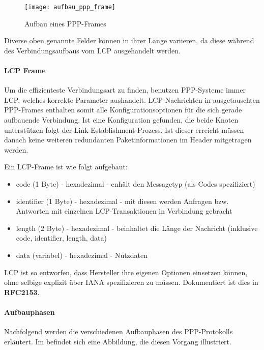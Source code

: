  \begin{figure}[htp]
  \begin{center}
   \texttt{[image: aufbau\_ppp\_frame]}
  \end{center}
  \caption[Aufbau eines PPP-Frames]{Aufbau eines PPP-Frames \cite{tcpipillustrated}}
  \label{abb:aufbau_ppp_frame}
 \end{figure}

Diverse oben genannte Felder können in ihrer Länge variieren, da 
diese während des Verbindungsaufbaus vom \ac{LCP} ausgehandelt werden.

\paragraph{LCP Frame} Um die effizienteste Verbindungsart zu finden, benutzen PPP-Systeme
immer \ac{LCP}, welches korrekte Parameter aushandelt. LCP-Nachrichten in ausgetauschten
PPP-Frames enthalten somit alle Konfigurationsoptionen für die sich gerade aufbauende
Verbindung. Ist eine Konfiguration gefunden, die beide Knoten unterstützen folgt der
Link-Establishment-Prozess. Ist dieser erreicht müssen danach keine weiteren redundanten
Paketinformationen im Header mitgetragen werden.

Ein LCP-Frame ist wie folgt aufgebaut:
\begin{itemize}
	\item code (1 Byte) - hexadezimal - enhält den Messagetyp (als Codes spezifiziert)
	\item identifier (1 Byte) - hexadezimal - mit diesen werden Anfragen bzw. Antworten mit einzelnen LCP-Transaktionen in Verbindung gebracht
	\item length (2 Byte) - hexadezimal - beinhaltet die Länge der Nachricht (inklusive code, identifier, length, data)
	\item data (variabel) - hexadezimal - Nutzdaten
\end{itemize}

\ac{LCP} ist so entworfen, dass Hersteller ihre eigenen Optionen einsetzen können, ohne
selbige explizit über \ac{IANA} spezifizieren zu müssen. Dokumentiert ist dies in \textbf{RFC2153}.

\paragraph{Aufbauphasen} Nachfolgend werden die verschiedenen Aufbauphasen des
PPP-Protokolls erläutert. Im  befindet
sich eine Abbildung, die diesen Vorgang illustriert.

